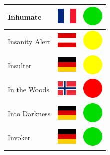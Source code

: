 \documentclass[12pt, a4paper, twoside]{report}
\begin{document}
\begin{center}
\begin{longtable}{|p{5cm}|p{2cm}|p{2cm}|}
Inhumate & \includegraphics[width=1cm]{4x3/fr} & \includegraphics[width=1cm]{likes/y} \\ \hline
Insanity Alert & \includegraphics[width=1cm]{4x3/at} & \includegraphics[width=1cm]{likes/m} \\ \hline
Insulter & \includegraphics[width=1cm]{4x3/de} & \includegraphics[width=1cm]{likes/m} \\ \hline
In the Woods & \includegraphics[width=1cm]{4x3/no} & \includegraphics[width=1cm]{likes/n} \\ \hline
Into Darkness & \includegraphics[width=1cm]{4x3/de} & \includegraphics[width=1cm]{likes/y} \\ \hline
Invoker & \includegraphics[width=1cm]{4x3/de} & \includegraphics[width=1cm]{likes/y} \\ \hline

\end{longtable}
\end{center}
\end{document}
